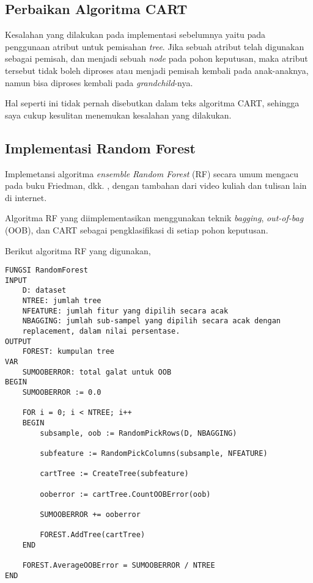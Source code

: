 \subsection{Perbaikan Algoritma CART}

Kesalahan yang dilakukan pada implementasi sebelumnya yaitu pada penggunaan
atribut untuk pemisahan \textit{tree}.
Jika sebuah atribut telah digunakan sebagai pemisah, dan menjadi sebuah
\textit{node} pada pohon keputusan, maka atribut tersebut tidak boleh diproses
atau menjadi pemisah kembali pada anak-anaknya, namun bisa diproses kembali
pada \textit{grandchild}-nya.

Hal seperti ini tidak pernah disebutkan dalam teks algoritma CART,
sehingga saya cukup kesulitan menemukan kesalahan yang dilakukan.

\subsection{Implementasi Random Forest}

Implemetansi algoritma \textit{ensemble} \textit{Random Forest} (RF) secara
umum mengacu pada buku Friedman, dkk. \cite{friedman2001elements}, dengan
tambahan dari video kuliah dan tulisan lain di internet.

Algoritma RF yang diimplementasikan menggunakan teknik \textit{bagging},
\textit{out-of-bag} (OOB), dan CART sebagai pengklasifikasi di setiap pohon
keputusan.

\clearpage

Berikut algoritma RF yang digunakan,

\begin{lstlisting}
FUNGSI RandomForest
INPUT
	D: dataset
	NTREE: jumlah tree
	NFEATURE: jumlah fitur yang dipilih secara acak
	NBAGGING: jumlah sub-sampel yang dipilih secara acak dengan
	replacement, dalam nilai persentase.
OUTPUT
	FOREST: kumpulan tree
VAR
	SUMOOBERROR: total galat untuk OOB
BEGIN
	SUMOOBERROR := 0.0

	FOR i = 0; i < NTREE; i++
	BEGIN
		subsample, oob := RandomPickRows(D, NBAGGING)

		subfeature := RandomPickColumns(subsample, NFEATURE)

		cartTree := CreateTree(subfeature)

		ooberror := cartTree.CountOOBError(oob)

		SUMOOBERROR += ooberror

		FOREST.AddTree(cartTree)
	END

	FOREST.AverageOOBError = SUMOOBERROR / NTREE
END
\end{lstlisting}

